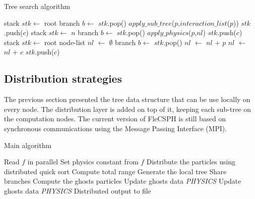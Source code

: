 \begin{algorithm}
\caption{Tree search algorithm}\label{alg:find_nodes}
\begin{algorithmic}[1]
\State stack $stk \leftarrow$ root
	\State branch $b \leftarrow$ $stk$.pop() 
			\State $apply\_sub\_tree$($p$,$interaction\_list$($p$))
		\EndFor
	\Else
			\State $stk$.push($c$)
		\EndFor
	\EndIf
\EndWhile
\EndProcedure
\State
{}
\State stack $stk \leftarrow$ $n$
	\State branch $b \leftarrow$ $stk$.pop() 
			\State $apply\_physics$($p$,$nl$)
		\EndFor
	\Else
			\State $stk$.push($c$)
		\EndFor
	\EndIf
\EndWhile
\EndProcedure
\State
{}
\State stack $stk \leftarrow$ root
\State node-list $nl$ $\leftarrow$ $\emptyset$
	\State branch $b \leftarrow$ $stk$.pop() 
				\State $nl$ $\leftarrow$ $nl$ + $p$
			\EndIf
		\EndFor
	\Else
				\State $nl$ $\leftarrow$ $nl$ + $c$
			\Else				
				\State $stk$.push($c$)
			\EndIf	
		\EndFor
	\EndIf
\EndWhile
\EndFunction
\end{algorithmic}
\end{algorithm}

\subsection{Distribution strategies}

The previous section presented the tree data structure that can be use locally on every node. 
The distribution layer is added on top of it, keeping each sub-tree on the computation nodes. 
The current version of FleCSPH is still based on synchronous communications using the Message Passing Interface (MPI). 

\begin{algorithm}
\caption{Main algorithm}\label{alg:main_distributed}
\begin{algorithmic}[1]
\State Read $f$ in parallel 
\State Set physics constant from $f$
\State Distribute the particles using distributed quick sort\label{alg_main:qsort}
\State Compute total range 
\State Generate the local tree
\State Share branches\label{alg_main:share_branches}
\State Compute the ghosts particles\label{alg_main:cp_ghosts}
\State Update ghosts data\label{alg_main:up_ghosts}
\State \textit{PHYSICS}
\State Update ghosts data
\State \textit{PHYSICS}
\State Distributed output to file 
\EndWhile
\EndProcedure
\end{algorithmic}
\end{algorithm}


